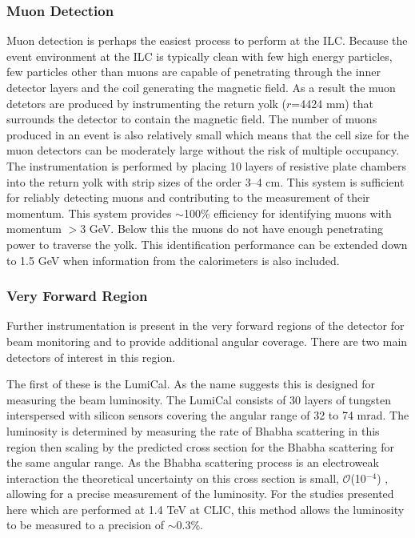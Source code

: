\subsubsection{Muon Detection}
Muon detection is perhaps the easiest process to perform at the ILC. Because the event environment at the ILC is typically clean with few high energy particles, few particles other than muons are capable of penetrating through the inner detector layers and the coil generating the magnetic field. As a result the muon detetors are produced by instrumenting the return yolk ($r$=4424 mm) that surrounds the detector to contain the magnetic field. The number of muons produced in an event is also relatively small which means that the cell size for the muon detectors can be moderately large without the risk of multiple occupancy. The instrumentation is performed by placing 10 layers of resistive plate chambers into the return yolk with strip sizes of the order 3--4 cm. This system is sufficient for reliably detecting muons and contributing to the measurement of their momentum. This system provides $\sim$100\% efficiency for identifying muons with momentum $>$3 GeV. Below this the muons do not have enough penetrating power to traverse the yolk. This identification performance can be extended down to 1.5 GeV when information from the calorimeters is also included.

\subsubsection{Very Forward Region}

Further instrumentation is present in the very forward regions of the detector for beam monitoring and to provide additional angular coverage. There are two main detectors of interest in this region.

The first of these is the LumiCal. As the name suggests this is designed for measuring the beam luminosity. The LumiCal consists of 30 layers of tungsten interspersed with silicon sensors covering the angular range of 32 to 74 mrad. The luminosity is determined by measuring the rate of Bhabha scattering in this region then scaling by the predicted cross section for the Bhabha scattering for the same angular range. As the Bhabha scattering process is an electroweak interaction the theoretical uncertainty on this cross section is small, $\mathcal{O}$(10$^{-4}$) \cite{BozovicJelisavcic:2010hy}, allowing for a precise measurement of the luminosity. For the studies presented here which are performed at 1.4 TeV at CLIC, this method allows the luminosity to be measured to a precision of $\sim$0.3\%.

